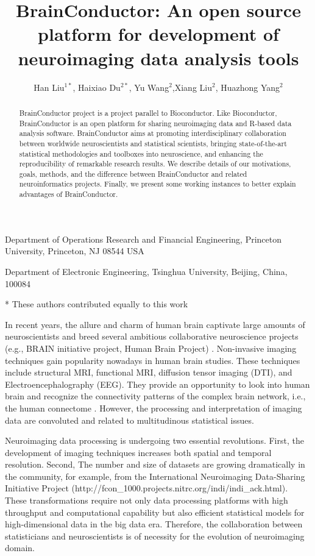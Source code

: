 \documentclass{nature}
\title{BrainConductor: An open source platform for development of neuroimaging data analysis tools}
\author{Han Liu$^{1*}$, Haixiao Du$^{2*}$, Yu Wang$^2$,Xiang Liu$^2$, Huazhong Yang$^2$}
\begin{document}
\maketitle



\begin{affiliations}
\item Department of Operations Research and Financial Engineering, Princeton University, Princeton, NJ 08544 USA
\item Department of Electronic Engineering, Tsinghua University, Beijing, China, 100084
\item[*] These authors contributed equally to this work
\end{affiliations}

\begin{abstract}
    BrainConductor project is a project parallel to Bioconductor. Like Bioconductor, BrainConductor is an open platform for sharing neuroimaging data and R-based data analysis software. BrainConductor aims at promoting interdisciplinary collaboration between worldwide neuroscientists and statistical scientists, bringing state-of-the-art statistical methodologies and toolboxes into neuroscience, and enhancing the reproducibility of remarkable research results. We describe details of our motivations, goals, methods, and the difference between BrainConductor and related neuroinformatics projects. Finally, we present some working instances to better explain advantages of BrainConductor.
\end{abstract}

In recent years, the allure and charm of human brain captivate large amounts of neuroscientists and breed several ambitious collaborative neuroscience projects (e.g., BRAIN initiative project, Human Brain Project) \cite{kandel2013neuroscience}. Non-invasive imaging techniques gain popularity nowadays in human brain studies. These techniques include structural MRI, functional MRI, diffusion tensor imaging (DTI), and Electroencephalography (EEG). They provide an opportunity to look into human brain and recognize the connectivity patterns of the complex brain network, i.e., the human connectome \cite{sporns2005human,sporns2011human}. However, the processing and interpretation of imaging data are convoluted and related to multitudinous statistical issues. 

Neuroimaging data processing is undergoing two essential revolutions. First, the development of imaging techniques increases both spatial and temporal resolution. Second,  The number and size of datasets are growing dramatically in the community, for example, from the International Neuroimaging Data-Sharing Initiative Project (http://fcon\_1000.projects.nitrc.org/indi/indi\_ack.html). These transformations require not only data processing platforms with high throughput and computational capability but also efficient statistical models for high-dimensional data in the big data era. Therefore, the collaboration between statisticians and neuroscientists is of necessity for the evolution of neuroimaging domain. 
\end{document}
